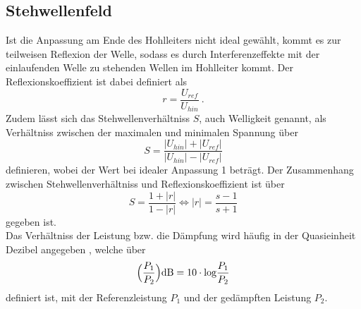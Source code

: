 \subsection{Stehwellenfeld}
Ist die Anpassung am Ende des Hohlleiters nicht ideal gewählt, kommt es zur teilweisen Reflexion
der Welle, sodass es durch Interferenzeffekte mit der einlaufenden Welle zu stehenden
Wellen im Hohlleiter kommt. Der Reflexionskoeffizient ist dabei definiert als
\begin{equation}
    r= \frac{U_{ref}}{U_{hin}} \:.
  \label{eqn:refl}
\end{equation}
Zudem lässt sich das Stehwellenverhältniss $S$, auch Welligkeit genannt, als Verhältniss
zwischen der maximalen und minimalen Spannung über
\begin{equation}
    S= \frac{\lvert U_{hin}\rvert + \lvert U_{ref}\rvert}{\lvert U_{hin}\rvert - \lvert U_{ref}\rvert}
  \label{eqn:SWV}
\end{equation}
definieren, wobei der Wert bei idealer Anpassung 1 beträgt. Der Zusammenhang zwischen Stehwellenverhältniss
und Reflexionskoeffizient ist über
\begin{equation}
    S= \frac{1 + \lvert r\rvert}{1 - \lvert r\rvert} \iff \lvert r\rvert = \frac{s-1}{s+1}
  \label{eqn:reflundSWV}
\end{equation}
gegeben ist. \\
Das Verhältniss der Leistung bzw. die Dämpfung wird häufig in der Quasieinheit Dezibel angegeben ,
welche über
\begin{equation}
    \Bigl(\frac{P_1}{P_2}\Bigr)\text{dB}=10\cdot\text{log}\frac{P_1}{P_2}
    \label{eqn:dezibel}
\end{equation}
definiert ist, mit der Referenzleistung $P_1$ und der gedämpften Leistung $P_2$.
